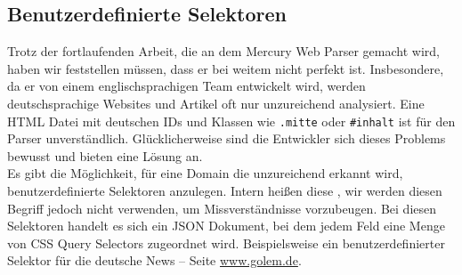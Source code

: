 \subsection{Benutzerdefinierte Selektoren}
Trotz der fortlaufenden Arbeit, die an dem Mercury Web Parser gemacht wird, haben wir feststellen müssen, dass er bei weitem nicht perfekt ist. Insbesondere, da er von einem englischsprachigen Team entwickelt wird, werden deutschsprachige Websites und Artikel oft nur unzureichend analysiert. Eine HTML Datei mit deutschen IDs und Klassen wie \verb|.mitte| oder \verb|#inhalt| ist für den Parser unverständlich. Glücklicherweise sind die Entwickler sich dieses Problems bewusst und bieten eine Lösung an. \\
Es gibt die Möglichkeit, für eine Domain die unzureichend erkannt wird, benutzerdefinierte Selektoren anzulegen. Intern heißen diese , wir werden diesen Begriff jedoch nicht verwenden, um Missverständnisse vorzubeugen. Bei diesen Selektoren handelt es sich ein \ac{JSON} Dokument, bei dem jedem Feld eine Menge von CSS Query Selectors zugeordnet wird. \cite{mercury_custom} Beispielsweise ein benutzerdefinierter Selektor für die deutsche News – Seite \url{www.golem.de}.














